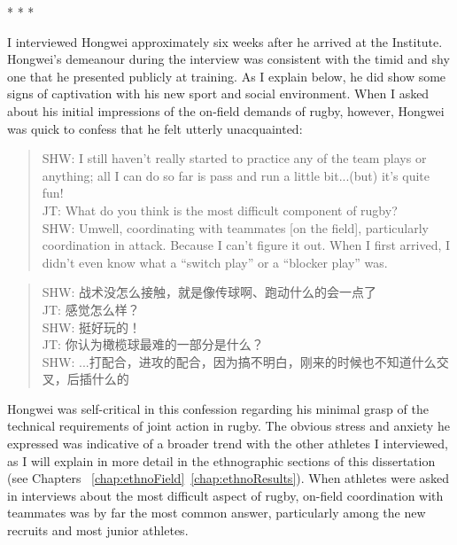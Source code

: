 \begin{CJK}{UTF8}{gbsn}
                            \begin{center}
                                * * *
                            \end{center}

I interviewed Hongwei approximately six weeks after he arrived at the Institute.  Hongwei's demeanour during the interview was consistent with the timid and shy one that he presented publicly at training.  As I explain below, he did show some signs of captivation with his new sport and social environment.  When I asked about his initial impressions of the on-field demands of rugby, however, Hongwei was quick to confess that he felt utterly unacquainted:

  \begin{quote}
    SHW: I still haven't really started to practice any of the team plays or anything; all I can do so far is pass and run a little bit...(but) it's quite fun! \\
    JT: What do you think is the most difficult component of rugby? \\
    SHW: Um\textellipsis well, coordinating with teammates [on the field], particularly coordination in attack.  Because I can't figure it out.  When I first arrived, I didn't even know what a ``switch play'' or a ``blocker play'' was.
  \end{quote}

  \begin{quote}
    SHW: 战术没怎么接触，就是像传球啊、跑动什么的会一点了 \\
    JT: 感觉怎么样？\\
    SHW: 挺好玩的！\\
    JT: 你认为橄榄球最难的一部分是什么？ \\
    SHW: ...打配合，进攻的配合，因为搞不明白，刚来的时候也不知道什么交叉，后插什么的 \\
  \end{quote}

Hongwei was self-critical in this confession regarding his minimal grasp of the technical requirements of joint action in rugby.  The obvious stress and anxiety he expressed was indicative of a broader trend with the other athletes I interviewed, as I will explain in more detail in the ethnographic sections of this dissertation (see Chapters ~\ref{chap:ethnoField}\nobreakdash~\ref{chap:ethnoResults}). When athletes were asked in interviews about the most difficult aspect of rugby, on-field coordination with teammates was by far the most common answer, particularly among the new recruits and most junior athletes.


\end{CJK}
